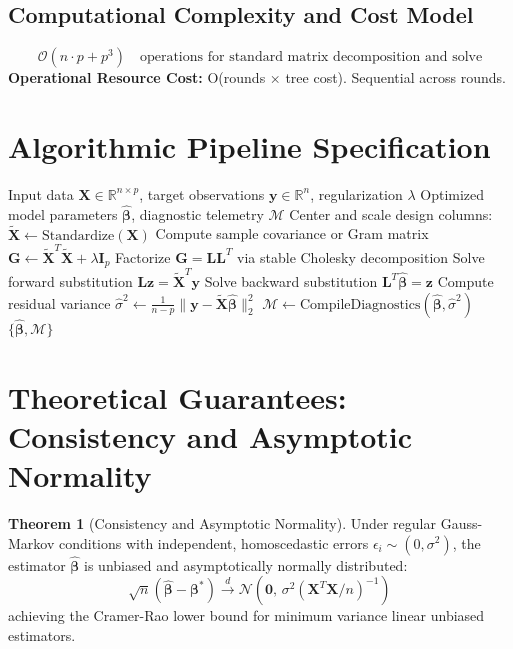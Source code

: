 \documentclass[11pt,a4paper]{article}
\theoremstyle{definition}
\newtheorem{theorem}{\textbf{Theorem}}[section]
\begin{document}
\subsection{Computational Complexity and Cost Model}
\begin{equation}
\mathcal{O}(n \cdot p + p^3) \quad \text{operations for standard matrix decomposition and solve}
\end{equation}
\textbf{Operational Resource Cost:} O(rounds × tree cost). Sequential across rounds.

\section{Algorithmic Pipeline Specification}

\begin{algorithm}[H]
\caption{Gradient boosting Execution}
\begin{algorithmic}[1]
\Require Input data $\mathbf{X} \in \mathbb{R}^{n \times p}$, target observations $\mathbf{y} \in \mathbb{R}^n$, regularization $\lambda$
\Ensure Optimized model parameters $\hat{\boldsymbol{\beta}}$, diagnostic telemetry $\mathcal{M}$
\State Center and scale design columns: $\tilde{\mathbf{X}} \gets \text{Standardize}(\mathbf{X})$
\State Compute sample covariance or Gram matrix $\mathbf{G} \gets \tilde{\mathbf{X}}^T \tilde{\mathbf{X}} + \lambda \mathbf{I}_p$
\State Factorize $\mathbf{G} = \mathbf{L} \mathbf{L}^T$ via stable Cholesky decomposition
\State Solve forward substitution $\mathbf{L} \mathbf{z} = \tilde{\mathbf{X}}^T \mathbf{y}$
\State Solve backward substitution $\mathbf{L}^T \hat{\boldsymbol{\beta}} = \mathbf{z}$
\State Compute residual variance $\hat{\sigma}^2 \gets \frac{1}{n - p} \| \mathbf{y} - \tilde{\mathbf{X}} \hat{\boldsymbol{\beta}} \|_2^2$
\State $\mathcal{M} \gets \text{CompileDiagnostics}(\hat{\boldsymbol{\beta}}, \hat{\sigma}^2)$
\State \Return $\{\hat{\boldsymbol{\beta}}, \mathcal{M}\}$
\end{algorithmic}
\end{algorithm}

\section{Theoretical Guarantees: Consistency and Asymptotic Normality}

\begin{theorem}[Consistency and Asymptotic Normality]
Under regular Gauss-Markov conditions with independent, homoscedastic errors $\epsilon_i \sim (0, \sigma^2)$, the estimator $\hat{\boldsymbol{\beta}}$ is unbiased and asymptotically normally distributed:
\begin{equation}
\sqrt{n}(\hat{\boldsymbol{\beta}} - \boldsymbol{\beta}^*) \xrightarrow{d} \mathcal{N}\left(\mathbf{0}, \, \sigma^2 (\mathbf{X}^T \mathbf{X} / n)^{-1}\right)
\end{equation}
achieving the Cramer-Rao lower bound for minimum variance linear unbiased estimators.
\end{theorem}
\end{document}
